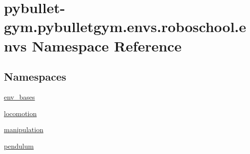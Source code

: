\hypertarget{namespacepybullet-gym_1_1pybulletgym_1_1envs_1_1roboschool_1_1envs}{}\section{pybullet-\/gym.pybulletgym.\+envs.\+roboschool.\+envs Namespace Reference}
\label{namespacepybullet-gym_1_1pybulletgym_1_1envs_1_1roboschool_1_1envs}
\subsection*{Namespaces}
\begin{DoxyCompactItemize}
\item 
 \hyperlink{namespacepybullet-gym_1_1pybulletgym_1_1envs_1_1roboschool_1_1envs_1_1env__bases}{env\+\_\+bases}
\item 
 \hyperlink{namespacepybullet-gym_1_1pybulletgym_1_1envs_1_1roboschool_1_1envs_1_1locomotion}{locomotion}
\item 
 \hyperlink{namespacepybullet-gym_1_1pybulletgym_1_1envs_1_1roboschool_1_1envs_1_1manipulation}{manipulation}
\item 
 \hyperlink{namespacepybullet-gym_1_1pybulletgym_1_1envs_1_1roboschool_1_1envs_1_1pendulum}{pendulum}
\end{DoxyCompactItemize}
